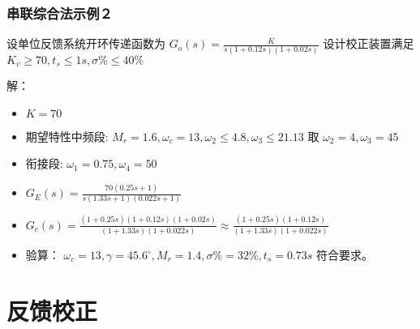 \documentclass[table]{beamer}
\begin{document}
\begin{frame}
\frametitle{串联综合法示例２}
\label{sec-5-2-4}

设单位反馈系统开环传递函数为
$G_o(s)=\frac{K}{s(1+0.12s)(1+0.02s)}$ 设计校正装置满足 $K_v\geq 70,t_s\leq1s,\sigma\%\leq 40\%$

解：
\begin{itemize}
\item $K=70$
\item 期望特性中频段: $M_r=1.6,\omega_c=13,\omega_2\leq 4.8,\omega_3\leq 21.13$ 取 $\omega_2=4,\omega_3=45$
\item 衔接段:  $\omega_1=0.75,\omega_4=50$
\item $G_E(s)=\frac{70(0.25s+1)}{s(1.33s+1)(0.022s+1)}$
\item $G_c(s)=\frac{(1+0.25s)(1+0.12s)(1+0.02s)}{(1+1.33s)(1+0.022s)}\approx \frac{(1+0.25s)(1+0.12s)}{(1+1.33s)(1+0.022s)}$
\item 验算： $\omega_c=13,\gamma=45.6^{\circ},M_r=1.4,\sigma\%=32\%,t_s=0.73s$ 符合要求。
\end{itemize}
\end{frame}
\section{反馈校正}
\label{sec-6}
\end{document}
